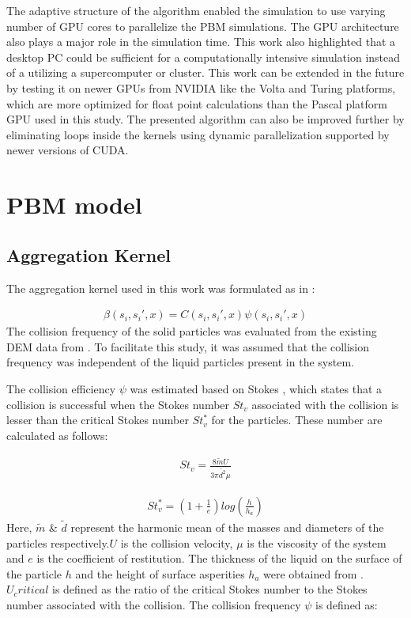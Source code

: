 \documentclass[preprint,10pt,authoryear,review]{elsarticle}
\begin{document}
The adaptive structure of the algorithm 
enabled the simulation to use varying number of GPU cores to parallelize the PBM simulations.
The GPU architecture also plays a major role in the simulation time. This work also 
highlighted that a desktop PC could be sufficient for a computationally intensive 
simulation instead of a utilizing a supercomputer or cluster. 
This work can be extended in the future by testing it on newer GPUs from NVIDIA 
like the Volta and Turing platforms, which are more optimized for float point calculations 
than the Pascal platform GPU used in this study. The presented algorithm can also be 
improved further by eliminating loops inside the kernels using dynamic parallelization 
supported by newer versions of CUDA.

\appendix
\section{PBM model}
\label{app:A}
\subsection{Aggregation Kernel}
\label{app:aggKernel}

The aggregation kernel used in this work was formulated as in \cite{Barrasso2015ces}: 

\begin{align}
\beta(s_i,s_i',x)=C(s_i,s_i',x)\psi(s_i,s_i',x)
\label{eqn:mthds_pbm_beta_kernal}
\end{align}
The collision frequency of the solid particles was evaluated from the existing 
DEM data from \citep{Sampat2018}. To facilitate this study, it was assumed that
the collision frequency was independent of the liquid particles present in the 
system.

The collision efficiency $\psi$ was estimated based on Stokes , which 
states that a collision is successful when the Stokes number $St_v$ associated 
with the collision is lesser than the critical Stokes number ${St^*_v}$ for the 
particles. These number are calculated as follows:

\begin{align}
St_v=\frac{8\tilde{m}U}{3\pi\tilde{d^2}\mu}
\label{eqn:mthds_pbm_agg_Stnum}
\end{align}

\begin{align}
St^*_v=\left(1+\frac{1}{e}\right)log\left(\frac{h}{h_a}\right)
\label{eqn:mthds_pbm_agg_cricSt}
\end{align}
Here, $\tilde{m}$ \& $\tilde{d}$ represent the harmonic mean of the masses and 
diameters of the particles respectively.$U$ is the collision velocity, $\mu$ is the 
viscosity of the system and $e$ is the coefficient of restitution. The thickness of 
the liquid on the surface of the particle $h$ and the height of surface asperities 
$h_a$ were obtained from \citep{Barrasso2015ces}. $U_critical$ is defined as the 
ratio of the critical Stokes number to the Stokes number associated with the collision. 
The collision frequency $\psi$ is defined as:
\end{document}
